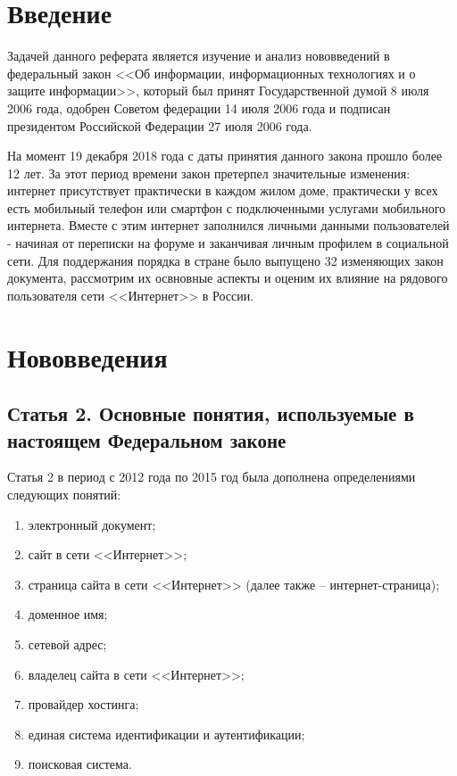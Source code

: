 





\tableofcontents
\newpage

\section{Введение}

Задачей данного реферата является изучение и анализ нововведений в федеральный закон <<Об информации, информационных технологиях и о защите информации>>, который был принят Государственной думой 8 июля 2006 года, одобрен Советом федерации 14 июля 2006 года и подписан президентом Российской Федерации 27 июля 2006 года. 


На момент 19 декабря 2018 года с даты принятия данного закона прошло более 12 лет. За этот период времени закон претерпел значительные изменения: интернет присутствует практически в каждом жилом доме, практически у всех есть мобильный телефон или смартфон с подключенными услугами мобильного интернета. Вместе с этим интернет заполнился личными данными пользователей - начиная от переписки на форуме и заканчивая личным профилем в социальной сети. Для поддержания порядка в стране было выпущено 32 изменяющих закон документа, рассмотрим их освновные аспекты и оценим их влияние на рядового пользователя сети <<Интернет>> в России.

\section{Нововведения}
\subsection{Статья 2. Основные понятия, используемые в настоящем Федеральном законе}

Статья 2 в период с 2012 года по 2015 год была дополнена определениями следующих понятий: 

\begin{enumerate}
	\item электронный документ;
	\item сайт в сети <<Интернет>>;
	\item страница сайта в сети <<Интернет>> (далее также -- интернет-страница);
	\item доменное имя;
	\item сетевой адрес;
	\item владелец сайта в сети <<Интернет>>;
	\item провайдер хостинга;
	\item единая система идентификации и аутентификации;
	\item поисковая система.
\end{enumerate} 

